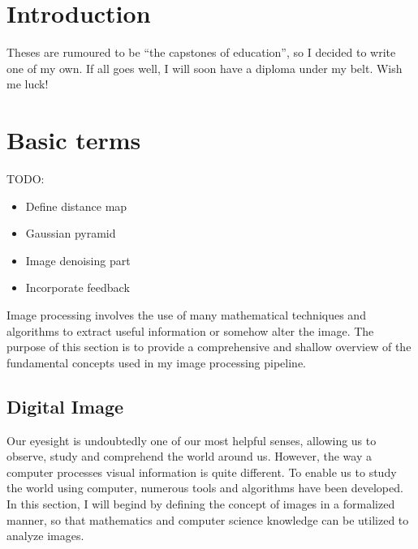 \documentclass[
  digital,     %
  oneside,     %
  nosansbold,  %
  nocolorbold, %
  lof,         %
  lot,         %
]{fithesis4}
\begin{document}
\chapter*{Introduction}

Theses are rumoured to be \enquote{the capstones of education}, so
I decided to write one of my own. If all goes well, I will soon
have a diploma under my belt. Wish me luck!

\chapter{Basic terms}

TODO:
\begin{itemize}
    \item{Define distance map}
    \item{Gaussian pyramid}
    \item{Image denoising part}
    \item{Incorporate feedback}
\end{itemize}

Image processing involves the use of many mathematical techniques and algorithms
to extract useful information or somehow alter the image. The purpose of this
section is to provide a comprehensive and shallow overview of the fundamental
concepts used in my image processing pipeline.

\section{Digital Image}
Our eyesight is undoubtedly one of our most helpful senses, allowing us to
observe, study and comprehend the world around us. However, the way a computer
processes visual information is quite different. To enable us to study the world
using computer, numerous tools and algorithms have been developed. In this
section, I will begind by defining the concept of images in a formalized manner,
so that mathematics and computer science knowledge can be utilized to analyze
images.
\end{document}
